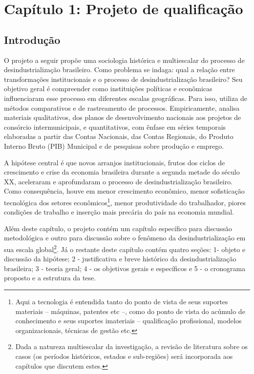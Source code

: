 \section{Capítulo 1: Projeto de qualificação}\label{capuxedtulo-1-projeto-de-qualificauxe7uxe3o}

\subsection{Introdução}\label{introduuxe7uxe3o}

O projeto a seguir propõe uma sociologia histórica e multiescalar do
processo de desindustrialização brasileiro. Como problema se indaga:
qual a relação entre transformações institucionais e o processo de
desindustrialização brasileiro? Seu objetivo geral é compreender como
instituições políticas e econômicas influenciaram esse processo em
diferentes escalas geográficas. Para isso, utiliza de métodos
comparativos e de rastreamento de processos. Empiricamente, analisa
materiais qualitativos, dos planos de desenvolvimento nacionais aos
projetos de consórcio intermunicipais, e quantitativos, com ênfase em
séries temporais elaboradas a partir das Contas Nacionais, das Contas
Regionais, do Produto Interno Bruto (PIB) Municipal e de pesquisas sobre
produção e emprego.

A hipótese central é que novos arranjos institucionais, frutos dos
ciclos de crescimento e crise da economia brasileira durante a segunda
metade do século XX, aceleraram e aprofundaram o processo de
desindustrialização brasileiro. Como consequência, houve em menor
crescimento econômico, menor sofisticação tecnológica dos setores
econômicos\footnote{Aqui a tecnologia é entendida tanto do ponto de
  vista de seus suportes materiais -- máquinas, patentes etc --, como do
  ponto de vista do acúmulo de conhecimento e seus suportes imateriais
  -- qualificação profissional, modelos organizacionais, técnicas de
  gestão etc.}, menor produtividade do trabalhador, piores condições de
trabalho e inserção mais precária do país na economia mundial.

Além deste capítulo, o projeto contém um capítulo específico para
discussão metodológica e outro para discussão sobre o fenômeno da
desindustrialização em sua escala global\footnote{Dada a natureza
  multiescalar da investigação, a revisão de literatura sobre os casos
  (os períodos históricos, estados e sub-regiões) será incorporada aos
  capítulos que discutem estes.}. Já o restante deste capítulo contém
quatro seções: 1- objeto e discussão da hipótese; 2 - justificativa e
breve histórico da desindustrialização brasileira; 3 - teoria geral; 4 -
os objetivos gerais e específicos e 5 - o cronograma proposto e a
estrutura da tese.

